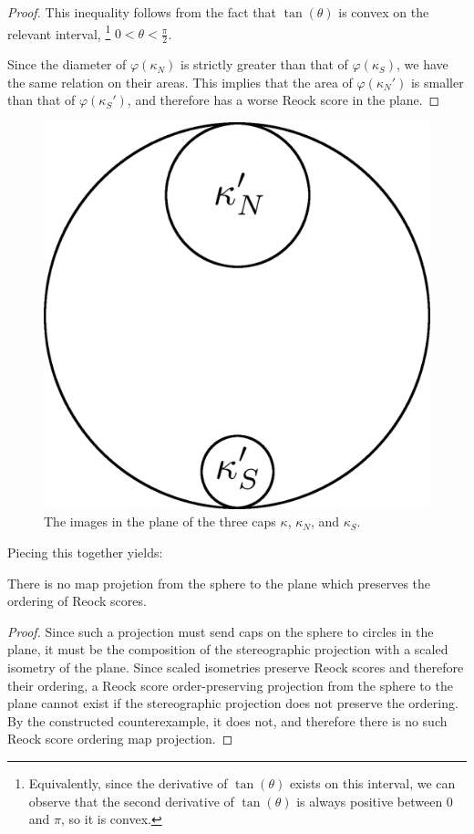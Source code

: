 \begin{proof}
This inequality follows from the fact that $\tan(\theta)$ is convex on the relevant interval, \footnote{Equivalently, since the derivative of $\tan(\theta)$ exists on this interval, we can observe that the second derivative of $\tan(\theta)$ is always positive between $0$ and $\pi$, so it is convex.} $0<\theta<\tfrac{\pi}{2}$.

Since  the diameter of $\varphi(\kappa_N)$ is strictly {greater} than that of $\varphi(\kappa_S)$, we have the same relation on their areas.  This implies that the area of $\varphi(\kappa_N')$ is smaller than that of $\varphi(\kappa_S')$, and therefore has a worse Reock score in the plane. 
   
  
\end{proof}


\begin{figure}[h]
	\centering
	\includegraphics[width=.3\textwidth]{figs/differentkappa.png}
	\caption{The images in the plane of the three caps $\kappa$, $\kappa_N$, and $\kappa_S$.}
	\label{fig:reock_schema}
\end{figure}

Piecing this together yields:
\begin{theorem}
  There is no map projetion from the sphere to the plane which preserves the ordering of Reock scores.
\end{theorem}

\begin{proof}
	  Since such a projection must send caps on the sphere to circles in the
	plane, it must be the composition of the stereographic projection with
	a scaled isometry of the plane.  Since scaled isometries preserve
	Reock scores and therefore their ordering, a Reock score
	order-preserving projection from the sphere to the plane cannot exist
	if the stereographic projection does not preserve the ordering.  By
	the constructed counterexample, it does not, and therefore there is no
	such Reock score ordering map projection.
\end{proof}
